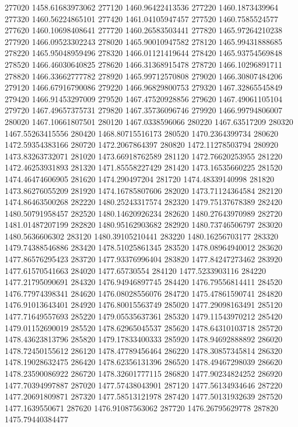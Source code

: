 {277020 1458.61683973062
277120 1460.96422413536
277220 1460.1873439964
277320 1460.56224865101
277420 1461.04105947457
277520 1460.7585524577
277620 1460.10698408641
277720 1460.26583503441
277820 1465.97264210238
277920 1466.09523302243
278020 1465.90010947582
278120 1465.99431888685
278220 1465.95048959496
278320 1466.01121419644
278420 1465.93754569848
278520 1466.46030640825
278620 1466.31368915478
278720 1466.10296891711
278820 1466.33662777782
278920 1465.99712570808
279020 1466.30807484206
279120 1466.67916790086
279220 1466.96829800753
279320 1467.32865545849
279420 1466.91453297009
279520 1467.47520928856
279620 1467.49061105104
279720 1467.49657375731
279820 1467.35736096746
279920 1466.99794806007
280020 1467.10661807501
280120 1467.0338596066
280220 1467.63517209
280320 1467.55263415556
280420 1468.80715516173
280520 1470.2364399734
280620 1472.59354383166
280720 1472.2067864397
280820 1472.11278503794
280920 1473.83263732071
281020 1473.66918762589
281120 1472.76620253955
281220 1472.46253931893
281320 1471.85558227429
281420 1473.16535660225
281520 1474.46474606905
281620 1474.290497204
281720 1474.48339140998
281820 1473.86276055209
281920 1474.16785807606
282020 1473.71124364584
282120 1474.86463500268
282220 1480.25243317574
282320 1479.75137678389
282420 1480.50791958457
282520 1480.14620926234
282620 1480.27643970989
282720 1481.01487207199
282820 1480.95162903682
282920 1480.73746506797
283020 1480.5636606302
283120 1480.39105210441
283220 1480.16256703177
283320 1479.74388546886
283420 1478.51025861345
283520 1478.08964940012
283620 1477.86576295423
283720 1477.93376996404
283820 1477.84247273462
283920 1477.61570541663
284020 1477.65730554
284120 1477.5233903116
284220 1477.21795090691
284320 1476.94946897745
284420 1476.79556814411
284520 1476.77974398341
284620 1476.08028556076
284720 1475.47861590741
284820 1476.91013643401
284920 1476.80015563749
285020 1477.29098163491
285120 1477.71649557693
285220 1479.05535637361
285320 1479.11543970212
285420 1479.01152690019
285520 1478.62965045537
285620 1478.64310103718
285720 1478.43623813796
285820 1479.17833400333
285920 1478.94692888892
286020 1478.72450155612
286120 1478.47789456464
286220 1478.30857345814
286320 1478.19028632475
286420 1478.62356131396
286520 1478.49467298039
286620 1478.23590086922
286720 1478.32601777115
286820 1477.90234824252
286920 1477.70394997887
287020 1477.57438043901
287120 1477.56134934646
287220 1477.20691809871
287320 1477.58513121978
287420 1477.50131932639
287520 1477.1639550671
287620 1476.91087563062
287720 1476.26795629778
287820 1475.79440384477
}
